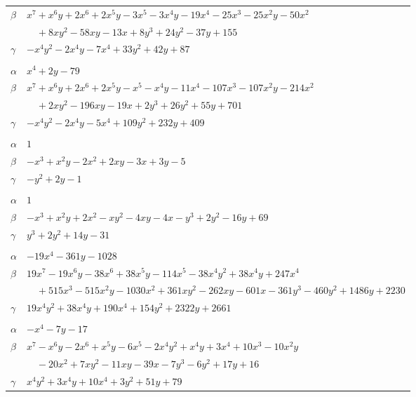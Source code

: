 \documentclass[11pt]{article}
\begin{document}
\begin{longtable}{@{}ll@{}}
$\beta$ & $x^{7}+x^{6}y+2x^{6}+2x^{5}y-3x^{5}-3x^{4}y-19x^{4}-25x^{3}-25x^{2}y-50x^{2}$\\
 & $\quad +8xy^{2}-58xy-13x+8y^{3}+24y^{2}-37y+155$\\
$\gamma$ & $-x^{4}y^{2}-2x^{4}y-7x^{4}+33y^{2}+42y+87$\\
\addlinespace[3pt]
\multicolumn{2}{@{}l}{$\{i,j\}=\{15,36\}$, $k_{ij}=2\cdot 3^{3}\cdot 5\cdot 7$}\\
$\alpha$ & $x^{4}+2y-79$\\
$\beta$ & $x^{7}+x^{6}y+2x^{6}+2x^{5}y-x^{5}-x^{4}y-11x^{4}-107x^{3}-107x^{2}y-214x^{2}$\\
 & $\quad +2xy^{2}-196xy-19x+2y^{3}+26y^{2}+55y+701$\\
$\gamma$ & $-x^{4}y^{2}-2x^{4}y-5x^{4}+109y^{2}+232y+409$\\
\addlinespace[3pt]
\multicolumn{2}{@{}l}{$\{i,j\}=\{16,36\}$, $k_{ij}=2^{3}$}\\
$\alpha$ & $1$\\
$\beta$ & $-x^{3}+x^{2}y-2x^{2}+2xy-3x+3y-5$\\
$\gamma$ & $-y^{2}+2y-1$\\
\addlinespace[3pt]
\multicolumn{2}{@{}l}{$\{i,j\}=\{17,18\}$, $k_{ij}=2^{3}\cdot 3\cdot 7$}\\
$\alpha$ & $1$\\
$\beta$ & $-x^{3}+x^{2}y+2x^{2}-xy^{2}-4xy-4x-y^{3}+2y^{2}-16y+69$\\
$\gamma$ & $y^{3}+2y^{2}+14y-31$\\
\addlinespace[3pt]
\multicolumn{2}{@{}l}{$\{i,j\}=\{17,22\}$, $k_{ij}=2^{4}\cdot 7^{3}$}\\
$\alpha$ & $-19x^{4}-361y-1028$\\
$\beta$ & $19x^{7}-19x^{6}y-38x^{6}+38x^{5}y-114x^{5}-38x^{4}y^{2}+38x^{4}y+247x^{4}$\\
 & $\quad +515x^{3}-515x^{2}y-1030x^{2}+361xy^{2}-262xy-601x-361y^{3}-460y^{2}+1486y+2230$\\
$\gamma$ & $19x^{4}y^{2}+38x^{4}y+190x^{4}+154y^{2}+2322y+2661$\\
\addlinespace[3pt]
\multicolumn{2}{@{}l}{$\{i,j\}=\{17,25\}$, $k_{ij}=7^{2}$}\\
$\alpha$ & $-x^{4}-7y-17$\\
$\beta$ & $x^{7}-x^{6}y-2x^{6}+x^{5}y-6x^{5}-2x^{4}y^{2}+x^{4}y+3x^{4}+10x^{3}-10x^{2}y$\\
 & $\quad -20x^{2}+7xy^{2}-11xy-39x-7y^{3}-6y^{2}+17y+16$\\
$\gamma$ & $x^{4}y^{2}+3x^{4}y+10x^{4}+3y^{2}+51y+79$\\

\end{longtable}
\end{document}
